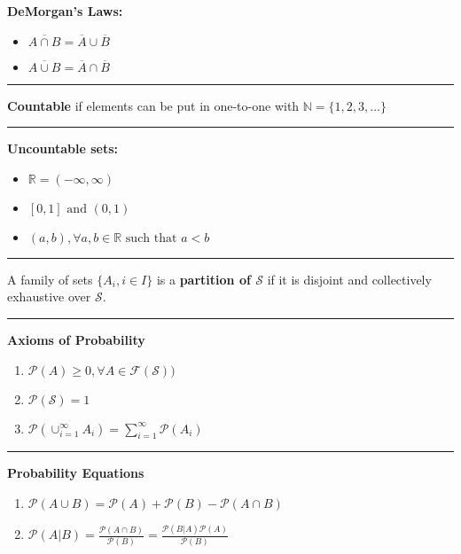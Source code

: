 \documentclass{article}
\renewcommand{\S}{\mathcal{S}}
\renewcommand{\P}{\mathcal{P}}
\providecommand{\F}{\mathcal{F}}
\providecommand{\N}{\mathbb{N}}
\providecommand{\R}{\mathbb{R}}
\begin{document}
    \raggedright
    \small
    \setlength{\columnseprule}{0.4pt}

    \begin{multicols*}{3}

        \textbf{DeMorgan's Laws:}\\
        \begin{itemize}
            \item $\overline{A\cap B} = \overline{A} \cup \overline{B}$\\
            \item $\overline{A\cup B} = \overline{A} \cap \overline{B}$
        \end{itemize}

        \noindent\rule{\columnwidth}{0.4pt}

        \textbf{Countable} if elements can be put in one-to-one with $\N = \{1,2,3,\dots\}$

        \noindent\rule{\columnwidth}{0.4pt}

        \textbf{Uncountable sets:}
        \begin{itemize}
            \item $\R = (-\infty, \infty)$
            \item $[0, 1] \text{ and } (0,1)$
            \item $(a,b), \forall a,b\in \R \text{ such that } a<b$
        \end{itemize}

        \noindent\rule{\columnwidth}{0.4pt}

        A family of sets $\{A_i,i\in I\}$ is a \textbf{partition of $\S$} if it is disjoint and collectively exhaustive over $\S$.

        \noindent\rule{\columnwidth}{0.4pt}

        \textbf{Axioms of Probability}
        \begin{enumerate}
            \item $\P(A)\geq0,\allowbreak\forall A\in\F(\S))$
            \item $\P(\S)=1$
            \item $\P(\cup_{i=1}^{\infty} A_i) = \sum_{i=1}^{\infty} \P( A_i)$
        \end{enumerate}

        \noindent\rule{\columnwidth}{0.4pt}

        \textbf{Probability Equations}
        \begin{enumerate}
            \item $\P(A\cup B) = \P(A)+\P(B)-\P(A\cap B)$
            \item $\P(A|B)=\frac{\P(A\cap B)}{\P(B)}=\frac{\P(B|A)\P(A)}{\P(B)}$
        \end{enumerate}


\end{multicols*}
\end{document}
